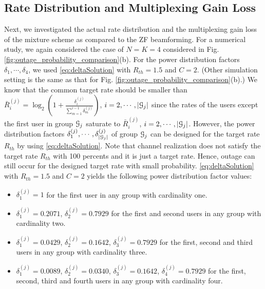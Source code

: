 \documentclass[11pt, draft, onecolumn ]{IEEEtran}
\begin{document}
\subsection{Rate Distribution and Multiplexing Gain Loss}
\label{subsec:num_MG}



Next, we investigated the actual rate distribution and the multiplexing gain loss of the mixture scheme as compared to the ZF beamforming. For a numerical study, we again considered the case of $N=K=4$ considered in Fig. \ref{fig:outage_probability_comparison}(b).  For the power distribution factors $\delta_1,\cdots,\delta_4$, we used \eqref{eq:deltaSolution} with $R_{th}=1.5$ and $C=2$. (Other simulation setting is the same as that for Fig. \ref{fig:outage_probability_comparison}(b).)  We know that the common target rate should be smaller than
$\bar{R}_i^{(j)} = \log_2 \left( 1+ \frac{\delta_i^{(j)}}{\sum_{m=1}^{i-1}\delta_m^{(j)}} \right)$, $i=2,\cdots,|{\cal G}_j|$ since the rates of the users except the first user in group ${\cal G}_j$ saturate to $\bar{R}_i^{(j)}$, $i=2,\cdots,|{\cal G}_j|$. However, the power distribution factors $\delta_1^{(j)},\cdots,\delta_{|{\cal G}_j|}^{(j)}$ of group ${\cal G}_j$ can be designed for the target rate $R_{th}$  by using \eqref{eq:deltaSolution}. Note that channel realization does not satisfy the target rate $R_{th}$  with 100 percents and it is just a target rate. Hence, outage can still occur for the designed target rate with small probability.
\eqref{eq:deltaSolution} with $R_{th}=1.5$ and $C=2$ yields the following power distribution factor values:

\begin{itemize}
\item $\delta_1^{(j)}=1$ for the first user in any group with cardinality one.

\item  $\delta_1^{(j)}= 0.2071$, $\delta_2^{(j)}=0.7929$  for the first and second users in any group with cardinality two.

\item  $\delta_1^{(j)}=0.0429$, $\delta_2^{(j)}=0.1642$, $\delta_3^{(j)}=0.7929$  for the first, second and third users in any group with cardinality three.

\item  $\delta_1^{(j)}=0.0089$, $\delta_2^{(j)}= 0.0340$, $\delta_3^{(j)}= 0.1642$, $\delta_4^{(j)}=0.7929$ for the first,  second, third and fourth users in any group with cardinality four.

\end{itemize}
\end{document}
